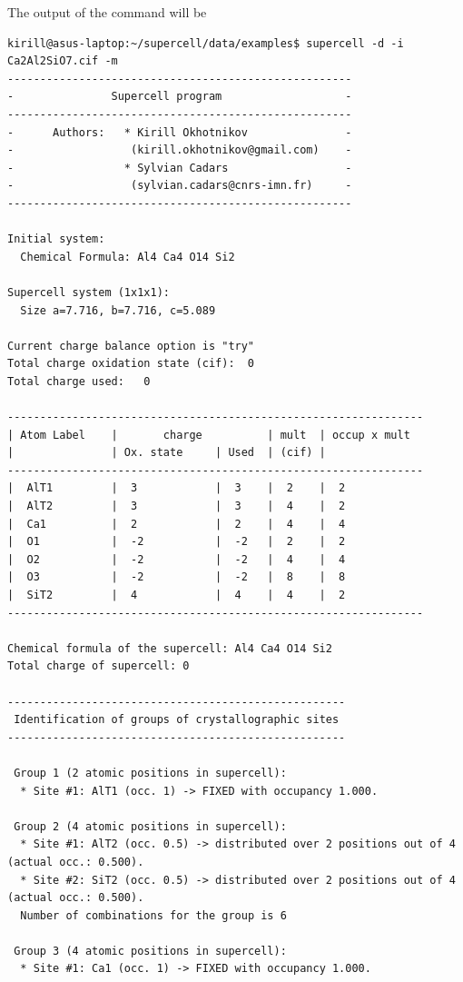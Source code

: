 \documentclass[a4paper,10pt]{article}
\begin{document}
The output of the command will be
\begin{verbatim}
kirill@asus-laptop:~/supercell/data/examples$ supercell -d -i Ca2Al2SiO7.cif -m 
-----------------------------------------------------
-               Supercell program                   -
-----------------------------------------------------
-      Authors:   * Kirill Okhotnikov               -
-                  (kirill.okhotnikov@gmail.com)    -
-                 * Sylvian Cadars                  -
-                  (sylvian.cadars@cnrs-imn.fr)     -
-----------------------------------------------------

Initial system:
  Chemical Formula: Al4 Ca4 O14 Si2

Supercell system (1x1x1):
  Size a=7.716, b=7.716, c=5.089

Current charge balance option is "try"
Total charge oxidation state (cif):  0
Total charge used:   0

----------------------------------------------------------------
| Atom Label    |       charge          | mult  | occup x mult
|               | Ox. state     | Used  | (cif) |                
----------------------------------------------------------------
|  AlT1         |  3            |  3    |  2    |  2
|  AlT2         |  3            |  3    |  4    |  2
|  Ca1          |  2            |  2    |  4    |  4
|  O1           |  -2           |  -2   |  2    |  2
|  O2           |  -2           |  -2   |  4    |  4
|  O3           |  -2           |  -2   |  8    |  8
|  SiT2         |  4            |  4    |  4    |  2
----------------------------------------------------------------

Chemical formula of the supercell: Al4 Ca4 O14 Si2
Total charge of supercell: 0

----------------------------------------------------
 Identification of groups of crystallographic sites 
----------------------------------------------------

 Group 1 (2 atomic positions in supercell):
  * Site #1: AlT1 (occ. 1) -> FIXED with occupancy 1.000.

 Group 2 (4 atomic positions in supercell):
  * Site #1: AlT2 (occ. 0.5) -> distributed over 2 positions out of 4 (actual occ.: 0.500).
  * Site #2: SiT2 (occ. 0.5) -> distributed over 2 positions out of 4 (actual occ.: 0.500).
  Number of combinations for the group is 6

 Group 3 (4 atomic positions in supercell):
  * Site #1: Ca1 (occ. 1) -> FIXED with occupancy 1.000.


\end{verbatim}
\end{document}

